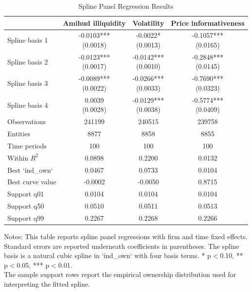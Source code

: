 \begin{table}[!htbp]\centering
\caption{Spline Panel Regression Results}
\label{tab:spline_panel_results}
\begin{threeparttable}
\footnotesize
\setlength{\tabcolsep}{3.5pt}
\renewcommand{\arraystretch}{1.05}
\begin{tabular}{lccc}
\toprule
 & Amihud illiquidity & Volatility & Price informativeness \\
\midrule
Spline basis 1 & \shortstack{-0.0103***\\(0.0018)} & \shortstack{-0.0022*\\(0.0013)} & \shortstack{-0.1057***\\(0.0165)} \\
Spline basis 2 & \shortstack{-0.0123***\\(0.0017)} & \shortstack{-0.0142***\\(0.0010)} & \shortstack{-0.2848***\\(0.0145)} \\
Spline basis 3 & \shortstack{-0.0089***\\(0.0022)} & \shortstack{-0.0266***\\(0.0033)} & \shortstack{-0.7690***\\(0.0323)} \\
Spline basis 4 & \shortstack{0.0039\\(0.0028)} & \shortstack{-0.0129***\\(0.0038)} & \shortstack{-0.5774***\\(0.0409)} \\
\midrule
Observations & 241199 & 240515 & 239758 \\
Entities & 8877 & 8858 & 8855 \\
Time periods & 100 & 100 & 100 \\
Within $R^2$ & 0.0898 & 0.2200 & 0.0132 \\
Best `ind_own` & 0.0467 & 0.0733 & 0.0104 \\
Best curve value & -0.0002 & -0.0050 & 0.8715 \\
Support q01 & 0.0104 & 0.0104 & 0.0104 \\
Support q50 & 0.0510 & 0.0511 & 0.0513 \\
Support q99 & 0.2267 & 0.2268 & 0.2266 \\
\bottomrule
\end{tabular}
\vspace{0.35em}
\noindent\parbox{\textwidth}{\footnotesize
Notes: This table reports spline panel regressions with firm and time fixed effects. Standard errors are reported underneath coefficients in parentheses. The spline basis is a natural cubic spline in `ind_own` with four basis terms. * p$<$0.10, ** p$<$0.05, *** p$<$0.01.\\
The sample support rows report the empirical ownership distribution used for interpreting the fitted spline.
}
\end{threeparttable}
\end{table}
